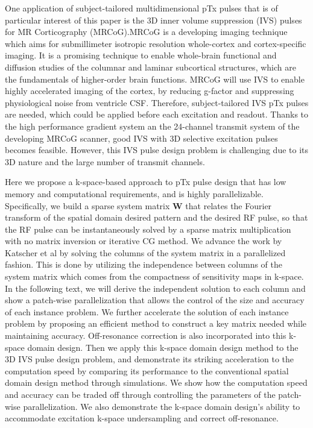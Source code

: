 \par One application of subject-tailored multidimensional pTx pulses that is of particular interest of this paper is the 3D inner volume suppression (IVS) pulses for MR Corticography (MRCoG).MRCoG is a developing imaging technique which aims for submillimeter isotropic resolution whole-cortex and cortex-specific imaging. 
It is a promising technique to enable whole-brain functional and diffusion studies of the columnar and laminar subcortical structures, which are the fundamentals of higher-order brain functions. 
MRCoG will use IVS to enable highly accelerated imaging of the cortex, by reducing g-factor and suppressing physiological noise from ventricle CSF. Therefore, subject-tailored IVS pTx pulses are needed, which could be applied before each excitation and readout. Thanks to the high performance gradient system an the 24-channel transmit system of the developing MRCoG scanner, good IVS with 3D selective excitation pulses becomes feasible. However, this IVS pulse design problem is challenging due to its 3D nature and the large number of transmit channels. 

\par Here we propose a k-space-based approach to pTx pulse design that has low memory and computational requirements, and is highly parallelizable. Specifically, we build a sparse system matrix $\mathbf{W}$ that relates the Fourier transform of the spatial domain desired pattern and the desired RF pulse, so that the RF pulse can be instantaneously solved by a sparse matrix multiplication with no matrix inversion or iterative CG method. We advance the work by Katscher et al \cite{katscher2003transmit} by solving the columns of the system matrix in a parallelized fashion. This is done by utilizing the independence between columns of the system matrix which comes from the compactness of sensitivity maps in k-space. 
In the following text, we will derive the independent solution to each column and show a patch-wise parallelization that allows the control of the size and accuracy of each instance problem. We further accelerate the solution of each instance problem by proposing an efficient method to construct a key matrix needed while maintaining accuracy. Off-resonance correction is also incorporated into this k-space domain design. 
Then we apply this k-space domain design method to the 3D IVS pulse design problem, and demonstrate its striking acceleration to the computation speed by comparing its performance to the conventional spatial domain design method through simulations. We show how the computation speed and accuracy can be traded off through controlling the parameters of the patch-wise parallelization. We also demonstrate the k-space domain design's ability to accommodate excitation k-space undersampling and correct off-resonance.  